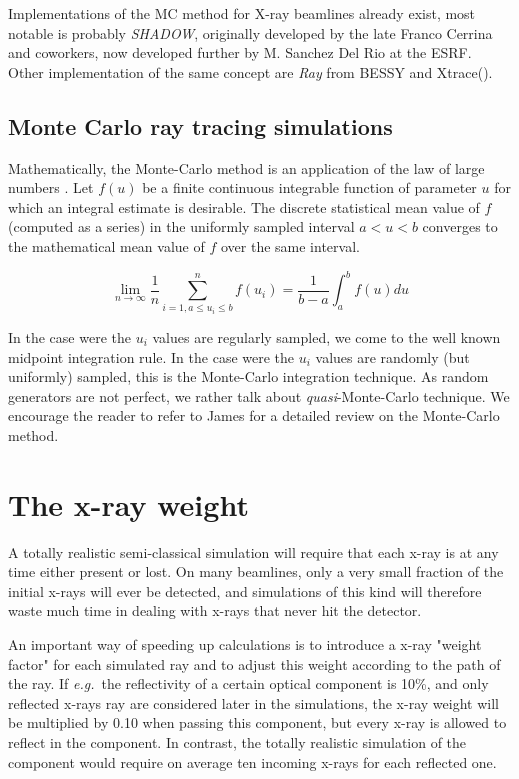 Implementations of the MC method for X-ray beamlines already exist, most
notable is probably \emph{SHADOW}, originally developed by the late Franco
Cerrina and coworkers, now developed further by M. Sanchez Del Rio at the ESRF\cite{SHADOW_esrf_website}.
Other implementation of the same concept are \emph{Ray}\cite{Ray-website} from BESSY and Xtrace(\cite{Xtrace-website}).


\subsection{Monte Carlo ray tracing simulations}
Mathematically, the Monte-Carlo method is an application of the law of large numbers \cite{James80,Grimmett92}. Let $f(u)$ be a finite continuous integrable function of parameter $u$ for which an integral estimate is desirable. The discrete statistical mean value of $f$ (computed as a series) in the uniformly sampled interval $a < u < b$ converges to the mathematical mean value of $f$ over the same interval.

\begin{equation}
\lim_{n \rightarrow \infty} \frac{1}{n} \sum_{i=1, a \leq u_i \leq b}^n f(u_i) = \frac{1}{b-a}\int_a^b f(u) du
\end{equation}

In the case were the $u_i$ values are regularly sampled, we come to the well known midpoint integration rule. In the case were the $u_i$ values are randomly (but uniformly) sampled, this is the Monte-Carlo integration technique. As random generators are not perfect, we rather talk about \emph{quasi}-Monte-Carlo technique. We encourage the reader to refer to James \cite{James80} for a detailed review on the Monte-Carlo method.

\section{The x-ray weight}
\label{s:probweight}
A totally realistic semi-classical simulation will require that
each x-ray is at any time either present or lost.
On many beamlines, only a very
small fraction of the initial x-rays will ever be detected, and
simulations of this kind will therefore waste much time in dealing
with x-rays that never hit the detector.

An important way of speeding up calculations is to introduce
a x-ray "weight factor" for each simulated ray and to
adjust this weight according to the path of the ray.
If {\em e.g.}\ the reflectivity of a certain
optical component is 10\%, and only reflected x-rays ray are
considered later in the simulations, the x-ray
weight will be multiplied by 0.10 when passing this component,
but every x-ray is allowed to reflect in the component.
In contrast, the totally realistic simulation of the component
would require on average ten incoming x-rays for each reflected one.

